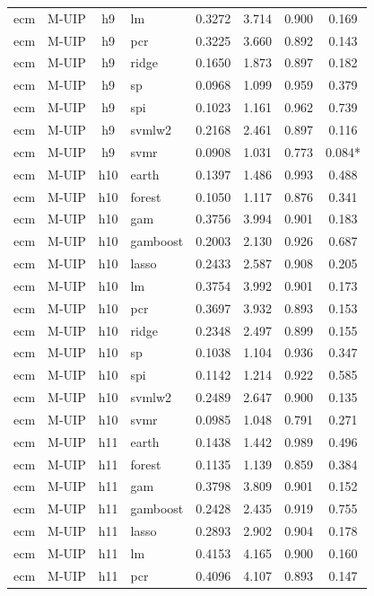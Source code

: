 \begin{ThreePartTable}
\begin{longtable}[t]{llclcccc}
ecm & M-UIP & h9 & lm & 0.3272 & 3.714 & 0.900 & 0.169\\
ecm & M-UIP & h9 & pcr & 0.3225 & 3.660 & 0.892 & 0.143\\
ecm & M-UIP & h9 & ridge & 0.1650 & 1.873 & 0.897 & 0.182\\
ecm & M-UIP & h9 & sp & 0.0968 & 1.099 & 0.959 & 0.379\\
ecm & M-UIP & h9 & spi & 0.1023 & 1.161 & 0.962 & 0.739\\
ecm & M-UIP & h9 & svmlw2 & 0.2168 & 2.461 & 0.897 & 0.116\\
ecm & M-UIP & h9 & svmr & 0.0908 & 1.031 & 0.773 & 0.084*\\
\addlinespace
ecm & M-UIP & h10 & earth & 0.1397 & 1.486 & 0.993 & 0.488\\
ecm & M-UIP & h10 & forest & 0.1050 & 1.117 & 0.876 & 0.341\\
ecm & M-UIP & h10 & gam & 0.3756 & 3.994 & 0.901 & 0.183\\
ecm & M-UIP & h10 & gamboost & 0.2003 & 2.130 & 0.926 & 0.687\\
ecm & M-UIP & h10 & lasso & 0.2433 & 2.587 & 0.908 & 0.205\\
ecm & M-UIP & h10 & lm & 0.3754 & 3.992 & 0.901 & 0.173\\
ecm & M-UIP & h10 & pcr & 0.3697 & 3.932 & 0.893 & 0.153\\
ecm & M-UIP & h10 & ridge & 0.2348 & 2.497 & 0.899 & 0.155\\
ecm & M-UIP & h10 & sp & 0.1038 & 1.104 & 0.936 & 0.347\\
ecm & M-UIP & h10 & spi & 0.1142 & 1.214 & 0.922 & 0.585\\
ecm & M-UIP & h10 & svmlw2 & 0.2489 & 2.647 & 0.900 & 0.135\\
ecm & M-UIP & h10 & svmr & 0.0985 & 1.048 & 0.791 & 0.271\\
\addlinespace
ecm & M-UIP & h11 & earth & 0.1438 & 1.442 & 0.989 & 0.496\\
ecm & M-UIP & h11 & forest & 0.1135 & 1.139 & 0.859 & 0.384\\
ecm & M-UIP & h11 & gam & 0.3798 & 3.809 & 0.901 & 0.152\\
ecm & M-UIP & h11 & gamboost & 0.2428 & 2.435 & 0.919 & 0.755\\
ecm & M-UIP & h11 & lasso & 0.2893 & 2.902 & 0.904 & 0.178\\
ecm & M-UIP & h11 & lm & 0.4153 & 4.165 & 0.900 & 0.160\\
ecm & M-UIP & h11 & pcr & 0.4096 & 4.107 & 0.893 & 0.147\\

\end{longtable}
\end{ThreePartTable}
